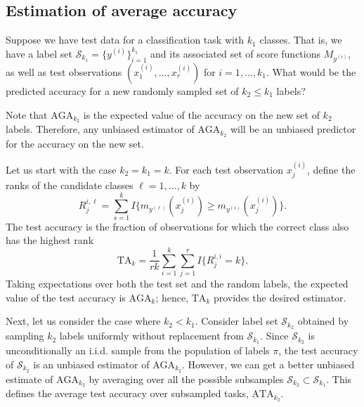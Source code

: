 \documentclass[12pt]{article}
\begin{document}
\subsection{Estimation of average accuracy}\label{sec:estimation_average_accuracy}

Suppose we have test data for a classification task with $k_1$ classes.  That is, we have a label set $\mathcal{S}_{k_1} =
\{y^{(i)}\}_{i=1}^{k_1}$ and its associated set of score functions
 $M_{y^{(i)}}$, as well as test observations $(x_1^{(i)},\hdots, x_{r}^{(i)})$ for $i =
1,\hdots, k_1$.  What would be the predicted accuracy for 
a new randomly sampled set of $k_2 \leq k_1$ labels? 

Note that $\text{AGA}_{k_2}$
is the expected value of the accuracy on the
new set of $k_2$ labels.  Therefore, any unbiased estimator of $\text{AGA}_{k_2}$ will be an unbiased predictor for the accuracy on the new set.

Let us start with the case $k_2 = k_1 = k$.  For each test observation $x_j^{(i)}$, define the ranks of the candidate classes $\ell = 1,\hdots, k$ by
\[
R_{j}^{i, \ell} = \sum_{s = 1}^k I\{m_{y^{(\ell)}}(x_j^{(i)}) \geq m_{y^{(s)}}(x_j^{(i)})\}.
\]
The test accuracy is the fraction of observations for which the correct class also has the highest rank
\begin{equation}\label{eq:test_risk}
\text{TA}_k = \frac{1}{r k} \sum_{i=1}^{k} \sum_{j=1}^{r} I\{R_j^{i,i} = k\}.
\end{equation}
Taking expectations over both the test set and the random labels, the expected value of the test accuracy is $\text{AGA}_k$; hence, $\text{TA}_k$ provides the desired estimator.

Next, let us consider the case where $k_2 < k_1$.  
Consider label set $\mathcal{S}_{k_2}$ obtained
by sampling $k_2$ labels uniformly without replacement from
$\mathcal{S}_{k_1}$. Since $\mathcal{S}_{k_2}$ is unconditionally an i.i.d. sample from 
the population of labels $\pi$, the test accuracy of $\mathcal{S}_{k_2}$ is an unbiased estimator of $\text{AGA}_{k_2}$.
However, we can get a better unbiased estimate of
$\text{AGA}_{k_2}$ by averaging over all the possible subsamples
$\mathcal{S}_{k_2} \subset \mathcal{S}_{k_1}$. 
This defines the average test accuracy over subsampled tasks, $\text{ATA}_{k_2}$.
\end{document}
